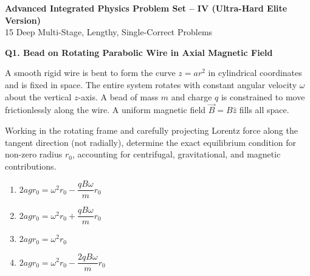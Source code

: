 \documentclass[12pt]{article}
\begin{document}
\begin{center}
\Large \textbf{Advanced Integrated Physics Problem Set -- IV (Ultra-Hard Elite Version)}\\
\large 15 Deep Multi-Stage, Lengthy, Single-Correct Problems
\end{center}

\bigskip

\textbf{Q1. Bead on Rotating Parabolic Wire in Axial Magnetic Field}


A smooth rigid wire is bent to form the curve $z = a r^2$ in cylindrical coordinates and is fixed in space. The entire system rotates with constant angular velocity $\omega$ about the vertical $z$-axis. A bead of mass $m$ and charge $q$ is constrained to move frictionlessly along the wire. A uniform magnetic field $\vec B = B\hat z$ fills all space.

Working in the rotating frame and carefully projecting Lorentz force along the tangent direction (not radially), determine the exact equilibrium condition for non-zero radius $r_0$, accounting for centrifugal, gravitational, and magnetic contributions.

\begin{center}
\end{center}

\begin{enumerate}
\item[(A)] $2agr_0 = \omega^2 r_0 - \dfrac{qB\omega}{m} r_0$
\item[(B)] $2agr_0 = \omega^2 r_0 + \dfrac{qB\omega}{m} r_0$
\item[(C)] $2agr_0 = \omega^2 r_0$
\item[(D)] $2agr_0 = \omega^2 r_0 - \dfrac{2qB\omega}{m} r_0$
\end{enumerate}
\end{document}

